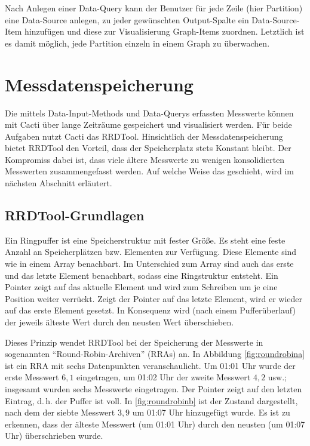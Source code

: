 \documentclass[12pt,ngerman,toc=listofnumbered,toc=bibliographynumbered,toc=index,headsepline=true]{scrbook}
\begin{document}
Nach Anlegen einer Data-Query kann der Benutzer für jede Zeile (hier Partition)
eine Data-Source anlegen, zu jeder gewünschten Output-Spalte ein
Data-Source-Item hinzufügen und diese zur Visualisierung Graph-Items zuordnen.
Letztlich ist es damit möglich, jede Partition einzeln in einem Graph zu
überwachen.

\chapter{Messdatenspeicherung}
\label{sec:messdatenspeicherung}
Die mittels Data-Input-Methods und Data-Querys erfassten Messwerte können mit
Cacti über lange Zeiträume gespeichert und visualisiert werden. Für beide
Aufgaben nutzt Cacti das RRDTool. Hinsichtlich der Messdatenspeicherung bietet
RRDTool den Vorteil, dass der Speicherplatz stets Konstant bleibt. Der
Kompromiss dabei ist, dass viele ältere Messwerte zu wenigen konsolidierten
Messwerten zusammengefasst werden. Auf welche Weise das geschieht, wird im
nächsten Abschnitt erläutert.

\section{RRDTool-Grundlagen}
Ein Ringpuffer ist eine Speicherstruktur mit fester Größe. Es steht eine feste
Anzahl an Speicherplätzen bzw. Elementen zur Verfügung. Diese Elemente sind wie
in einem Array benachbart. Im Unterschied zum Array sind auch das erste und das
letzte Element benachbart, sodass eine Ringstruktur entsteht. Ein Pointer zeigt
auf das aktuelle Element und wird zum Schreiben um je eine Position weiter
verrückt. Zeigt der Pointer auf das letzte Element, wird er wieder auf das erste
Element gesetzt. In Konsequenz wird (nach einem Pufferüberlauf) der jeweils
älteste Wert durch den neusten Wert überschieben.

Dieses Prinzip wendet RRDTool bei der Speicherung der Messwerte in sogenannten
\enquote{Round-Robin-Archiven} (RRAs) an. In Abbildung \ref{fig:roundrobina} ist
ein RRA mit sechs Datenpunkten veranschaulicht. Um 01:01 Uhr wurde der erste
Messwert $6,1$ eingetragen, um 01:02 Uhr der zweite Messwert $4,2$ usw.;
insgesamt wurden sechs Messwerte eingetragen. Der Pointer zeigt auf den letzten
Eintrag, d.\,h. der Puffer ist voll. In \ref{fig:roundrobinb} ist der Zustand
dargestellt, nach dem der siebte Messwert $3,9$ um 01:07 Uhr hinzugefügt wurde.
Es ist zu erkennen, dass der älteste Messwert (um 01:01 Uhr) durch den neusten
(um 01:07 Uhr) überschrieben wurde.
\end{document}
